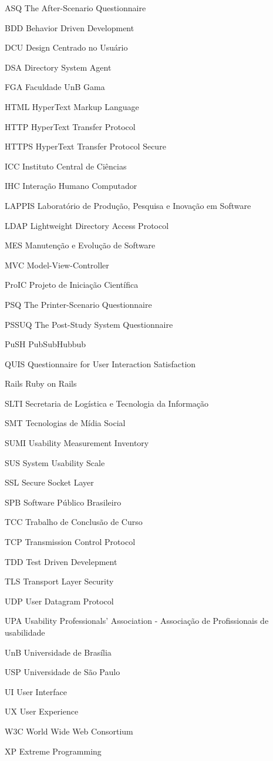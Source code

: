 \begin{siglas}
  \item[ASQ] The After-Scenario Questionnaire
  \item[BDD] Behavior Driven Development
  \item[DCU] Design Centrado no Usuário
  \item[DSA] Directory System Agent
  \item[FGA] Faculdade UnB Gama
  \item[HTML] HyperText Markup Language
  \item[HTTP] HyperText Transfer Protocol
  \item[HTTPS] HyperText Transfer Protocol Secure
  \item[ICC] Instituto Central de Ciências
  \item[IHC] Interação Humano Computador
  \item[LAPPIS] Laboratório de Produção, Pesquisa e Inovação em Software
  \item[LDAP] Lightweight Directory Access Protocol
  \item[MES] Manutenção e Evolução de Software
  \item[MVC] Model-View-Controller
  \item[ProIC] Projeto de Iniciação Científica
  \item[PSQ] The Printer-Scenario Questionnaire
  \item[PSSUQ] The Post-Study System Questionnaire
  \item[PuSH] PubSubHubbub
  \item[QUIS] Questionnaire for User Interaction Satisfaction
  \item[Rails] Ruby on Rails
  \item[SLTI] Secretaria de Logística e Tecnologia da Informação
  \item[SMT] Tecnologias de Mídia Social
  \item[SUMI] Usability Measurement Inventory
  \item[SUS] System Usability Scale
  \item[SSL] Secure Socket Layer
  \item[SPB] Software Público Brasileiro
  \item[TCC] Trabalho de Conclusão de Curso
  \item[TCP] Transmission Control Protocol
  \item[TDD] Test Driven Develepment
  \item[TLS] Transport Layer Security
  \item[UDP] User Datagram Protocol
  \item[UPA] Usability Professionals' Association - Associação de Profissionais de usabilidade
  \item[UnB] Universidade de Brasília
  \item[USP] Universidade de São Paulo
  \item[UI] User Interface
  \item[UX] User Experience
  \item[W3C] World Wide Web Consortium
  \item[XP] Extreme Programming

\end{siglas}
